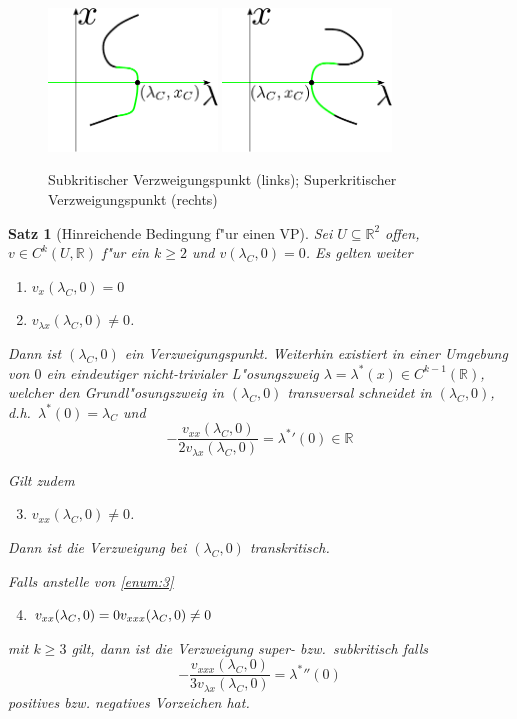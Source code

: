 \documentclass[a4paper, 13pt]{scrreprt}
\newtheorem{satz}{Satz}[section]
\theoremstyle{definition} \newtheorem{definition}{Definition}[section]
\newcommand{\RR}{\mathbb{R}}
\begin{document}
\begin{figure}[htpb]
		\centering
		\includegraphics[width=0.4\textwidth]{img/bifurkation/subkritischer_vp.pdf}
		\includegraphics[width=0.4\textwidth]{img/bifurkation/superkritischer_vp.pdf}
		\caption{Subkritischer Verzweigungspunkt (links); Superkritischer Verzweigungspunkt (rechts)}
\end{figure}

\begin{satz}[Hinreichende Bedingung f"ur einen VP]\label{hinreichend_verzweigungspunkt}
Sei $U\subseteq \RR^2$ offen, $v \in C^k(U, \RR)$ f"ur ein $k\geq 2$ und $v(\lambda_C,0)=0$. Es gelten weiter 
\begin{enumerate}
\item\label{enum:1}
$v_x(\lambda_C,0) = 0$

\item\label{enum:2}
$v_{\lambda x}(\lambda_C,0)\neq 0$.
\end{enumerate}
Dann ist $(\lambda_C,0)$ ein Verzweigungspunkt. Weiterhin existiert in einer Umgebung von $0$ ein eindeutiger nicht-trivialer L"osungszweig $\lambda = \lambda^*(x) \in C^{k-1}(\RR)$, welcher den Grundl"osungszweig in $(\lambda_C,0)$ \emph{transversal} schneidet in $(\lambda_C,0)$, d.h.\ $\lambda^*(0) = \lambda_C$ und 
$$-\frac{v_{xx}(\lambda_C,0)}{2v_{\lambda x}(\lambda_C,0)} = {\lambda^*}'(0)  \in \RR$$

Gilt zudem
\begin{enumerate}
\setcounter{enumi}{2}
\item\label{enum:3}
$v_{xx}(\lambda_C,0)\neq 0$.
\end{enumerate}
Dann ist die Verzweigung bei $(\lambda_C,0)$ transkritisch.

Falls anstelle von \ref{enum:3}
\begin{enumerate}
\setcounter{enumi}{3}
\item\label{enum:4}
\(
v_{xx}(\lambda_C,0) = 0\\
v_{xxx}(\lambda_C,0)\neq 0
\)
\end{enumerate}
mit $k\geq3$ gilt, dann ist die Verzweigung \emph{super- } bzw.\ \emph{subkritisch} falls $$-\frac{v_{xxx}(\lambda_C, 0)}{3v_{\lambda x}(\lambda_C, 0)} = {\lambda^*}''(0)$$ positives bzw. negatives Vorzeichen hat.
\end{satz}
\end{document}
